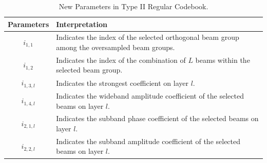 \documentclass[lettersize,journal]{IEEEtran}
\begin{document}
\begin{table}[t]   
\begin{center} 
\centering  
\captionsetup{
  labelsep=newline, %
}
\renewcommand{\arraystretch}{1.5}  %
\caption{New Parameters in Type II Regular Codebook.}  
\label{paratypeii} 
\begin{tabular}{|c|m{6cm}|}   
\hline   \textbf{Parameters} &\textbf{Interpretation} \\  
\hline   $i_{1,1}$ & Indicates the index of the selected orthogonal beam group among the oversampled beam groups. \\
\hline   $i_{1,2}$ & Indicates the index of the combination of $L$ beams within the selected beam group.\\
\hline   $i_{1,3,l}$ &  Indicates the strongest coefficient on layer \(l\).  \\
\hline   $i_{1,4,l}$ & Indicates the wideband amplitude coefficient of the selected beams on layer \(l\). \\
\hline   $i_{2,1,l}$ & Indicates the subband phase coefficient of the selected beams on layer \(l\). \\
\hline   $i_{2,2,l}$ & Indicates the subband amplitude coefficient of the selected beams on layer \(l\). \\


\end{tabular}
\end{center}
\end{table}
\end{document}
